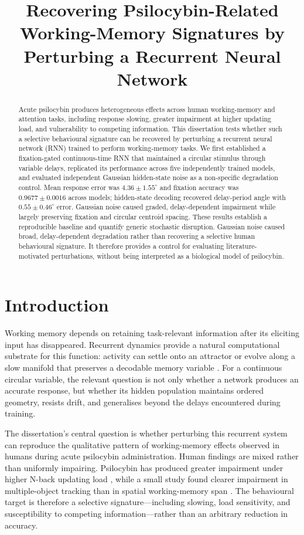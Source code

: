 \documentclass[12pt,a4paper]{article}
\title{Recovering Psilocybin-Related Working-Memory Signatures by Perturbing a Recurrent Neural Network}
\author{}
\date{}
\begin{document}
\maketitle

\begin{abstract}
Acute psilocybin produces heterogeneous effects across human working-memory and
attention tasks, including response slowing, greater impairment at higher
updating load, and vulnerability to competing information. This dissertation
tests whether such a selective behavioural signature can be recovered by
perturbing a recurrent neural network (RNN) trained to perform working-memory
tasks. We first established a fixation-gated continuous-time RNN that
maintained a circular stimulus through variable delays, replicated its
performance across five independently trained models, and evaluated
independent Gaussian hidden-state noise as a non-specific degradation control.
Mean response error was
$4.36\pm1.55^{\circ}$ and fixation accuracy was $0.9677\pm0.0016$ across
models; hidden-state decoding recovered delay-period angle with
$0.55\pm0.46^{\circ}$ error. Gaussian noise caused graded, delay-dependent
impairment while largely preserving fixation and circular centroid spacing.
These results establish a reproducible baseline and quantify generic
stochastic disruption. Gaussian noise caused broad, delay-dependent
degradation rather than recovering a selective human behavioural signature. It
therefore provides a control for evaluating literature-motivated perturbations,
without being interpreted as a biological model of psilocybin.
\end{abstract}

\section{Introduction}

Working memory depends on retaining task-relevant information after its
eliciting input has disappeared. Recurrent dynamics provide a natural
computational substrate for this function: activity can settle onto an
attractor or evolve along a slow manifold that preserves a decodable memory
variable \citep{wang2013nmda,kilpatrick2013,ghazizadeh2021}. For a continuous
circular variable, the relevant question is not only whether a network produces
an accurate response, but whether its hidden population maintains ordered
geometry, resists drift, and generalises beyond the delays encountered during
training.

The dissertation's central question is whether perturbing this recurrent
system can reproduce the qualitative pattern of working-memory effects
observed in humans during acute psilocybin administration. Human findings are
mixed rather than uniformly impairing. Psilocybin has produced greater
impairment under higher N-back updating load \citep{barrett2018}, while a small
study found clearer impairment in multiple-object tracking than in spatial
working-memory span \citep{carter2005}. The behavioural target is therefore a
selective signature---including slowing, load sensitivity, and susceptibility
to competing information---rather than an arbitrary reduction in accuracy.
\end{document}
